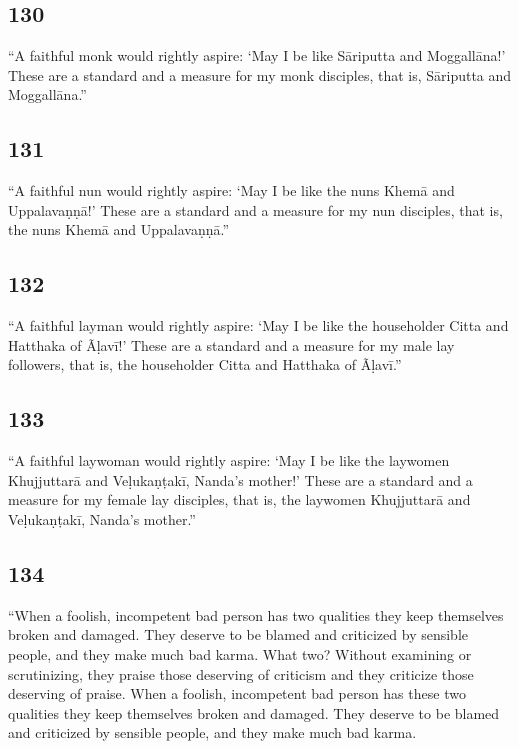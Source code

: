 \documentclass[12pt,openany]{book}%
\begin{document}
\subsection*{130 }

“A faithful monk would rightly aspire: ‘May I be like \textsanskrit{Sāriputta} and \textsanskrit{Moggallāna}!’ These are a standard and a measure for my monk disciples, that is, \textsanskrit{Sāriputta} and \textsanskrit{Moggallāna}.” 

\subsection*{131 }

“A faithful nun would rightly aspire: ‘May I be like the nuns \textsanskrit{Khemā} and \textsanskrit{Uppalavaṇṇā}!’ These are a standard and a measure for my nun disciples, that is, the nuns \textsanskrit{Khemā} and \textsanskrit{Uppalavaṇṇā}.” 

\subsection*{132 }

“A faithful layman would rightly aspire: ‘May I be like the householder Citta and Hatthaka of \textsanskrit{Ãḷavī}!’ These are a standard and a measure for my male lay followers, that is, the householder Citta and Hatthaka of \textsanskrit{Ãḷavī}.” 

\subsection*{133 }

“A faithful laywoman would rightly aspire: ‘May I be like the laywomen \textsanskrit{Khujjuttarā} and \textsanskrit{Veḷukaṇṭakī}, Nanda’s mother!’ These are a standard and a measure for my female lay disciples, that is, the laywomen \textsanskrit{Khujjuttarā} and \textsanskrit{Veḷukaṇṭakī}, Nanda’s mother.” 

\subsection*{134 }

“When a foolish, incompetent bad person has two qualities they keep themselves broken and damaged. They deserve to be blamed and criticized by sensible people, and they make much bad karma. What two? Without examining or scrutinizing, they praise those deserving of criticism and they criticize those deserving of praise. When a foolish, incompetent bad person has these two qualities they keep themselves broken and damaged. They deserve to be blamed and criticized by sensible people, and they make much bad karma. 
\end{document}
